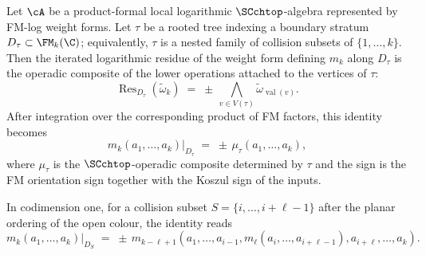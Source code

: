 \begin{theorem}
\label{thm:cluster_factorization}
Let $\cA$ be a product-formal local logarithmic\/ $\SCchtop$-algebra
represented by FM-log weight forms. Let
$\tau$ be a rooted tree indexing a boundary stratum
$D_\tau \subset \FM_k(\C)$; equivalently, $\tau$ is a nested family of
collision subsets of $\{1,\ldots,k\}$. Then the iterated logarithmic
residue of the weight form defining $m_k$ along $D_\tau$ is the
operadic composite of the lower operations attached to the vertices of
$\tau$:
\[
\operatorname{Res}_{D_\tau}(\widetilde\omega_k)
\;=\;
\pm\,
\bigwedge_{v\in V(\tau)}\widetilde\omega_{\operatorname{val}(v)} .
\]
After integration over the corresponding product of FM factors, this
identity becomes
\[
m_k(a_1,\ldots,a_k)\big|_{D_\tau}
\;=\;
\pm\,\mu_\tau(a_1,\ldots,a_k),
\]
where $\mu_\tau$ is the $\SCchtop$-operadic composite determined by
$\tau$ and the sign is the FM orientation sign together with the Koszul
sign of the inputs.

In codimension one, for a collision subset
$S=\{i,\ldots,i+\ell-1\}$ after the planar ordering of the open
colour, the identity reads
\[
m_k(a_1,\ldots,a_k)\big|_{D_S}
\;=\;
\pm\,
m_{k-\ell+1}(a_1,\ldots,a_{i-1},
m_\ell(a_i,\ldots,a_{i+\ell-1}),
a_{i+\ell},\ldots,a_k).
\]
\end{theorem}

